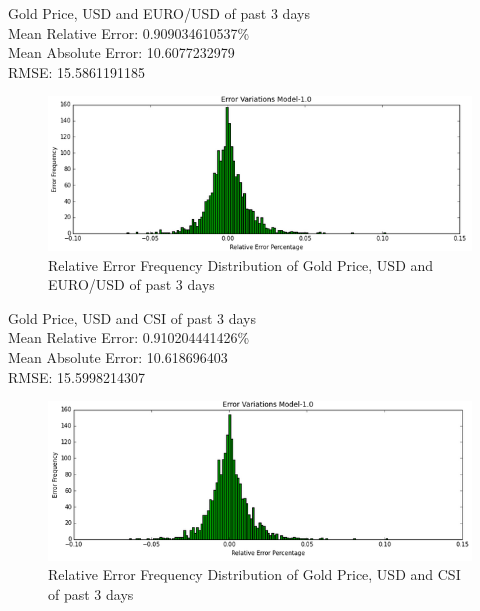 \documentclass[runningheads]{llncs}
\begin{document}
\noindent Gold Price, USD and EURO/USD of past 3 days \\
Mean Relative Error: 0.909034610537\% \\
Mean Absolute Error:  10.6077232979 \\
RMSE: 15.5861191185 \\
\begin{figure}
\centering
\includegraphics[width=\textwidth]{GoldUSDEuro_Daily.png}
\caption{Relative Error Frequency Distribution of Gold Price, USD and EURO/USD of past 3 days}
\label{fig:GoldUSDEuro_Daily.png}
\end{figure}

\noindent Gold Price, USD and CSI of past 3 days \\
Mean Relative Error: 0.910204441426\% \\
Mean Absolute Error: 10.618696403 \\
RMSE: 15.5998214307 \\
\begin{figure}
\centering
\includegraphics[width=\textwidth]{GoldUSDCSI_Daily.png}
\caption{Relative Error Frequency Distribution of Gold Price, USD and CSI of past 3 days}
\label{fig:GoldUSDCSI_Daily.png}
\end{figure}
\end{document}
